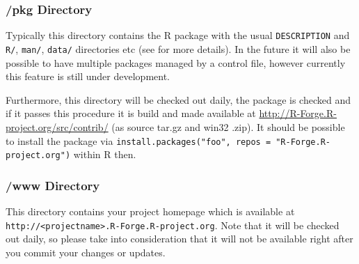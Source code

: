 \documentclass[a4paper]{article}
\begin{document}
\subsubsection{/pkg Directory}
Typically this directory contains the R package with the usual
\texttt{DESCRIPTION} and \texttt{R/}, \texttt{man/}, \texttt{data/}
directories etc (see \cite{Rcore:writing_R_extensions}
for more details).
In the future it will also be possible to have multiple
packages managed by a control file, however currently this feature is still
under development.

Furthermore, this directory will be checked out daily, the package is
checked and if it passes this procedure it is build and made available
at\newline 
\url{http://R-Forge.R-project.org/src/contrib/} (as source tar.gz and win32
.zip). It should be possible to install the package via
\texttt{install.packages("foo", repos = "R-Forge.R-project.org")} within R
then.

\subsubsection{/www Directory}
This directory contains your project homepage which is available at
\texttt{http://<projectname>.R-Forge.R-project.org}.
Note that it will be checked out daily, so please take
into consideration that it will not be available right after you
commit your changes or updates. 





\end{document}
